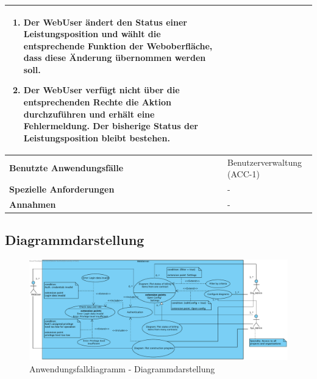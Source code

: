 \begin{longtable}[c]{|p{4cm}|p{10cm}|}
    \begin{enumerate}
        \item Der WebUser \"andert den Status einer Leistungsposition und w\"ahlt die entsprechende Funktion der Weboberfl\"ache,  dass diese \"Anderung \"ubernommen werden soll.
        \item Der WebUser verf\"ugt nicht \"uber die entsprechenden Rechte die Aktion durchzuf\"uhren und erh\"alt eine Fehlermeldung. Der bisherige Status der Leistungsposition bleibt bestehen.
    \end{enumerate}                                                                                                             \\ \hline
    \textbf{Benutzte Anwendungsfälle} & Benutzerverwaltung (ACC-1)                                                                         \\ \hline
    \textbf{Spezielle Anforderungen}  & -                                                                                                  \\ \hline
    \textbf{Annahmen}                 & -                                                                                                  \\ \hline
\end{longtable}

\clearpage

\subsection{Diagrammdarstellung}

\begin{figure}[h]
    \centering
    \includegraphics[width=\linewidth]{img/diagrams/diagramme_verwalten.pdf}
    \caption{Anwendungsfalldiagramm - Diagrammdarstellung}
    \label{fig:anwendungsfalldiagramm-dia-verwaltung}
\end{figure}

